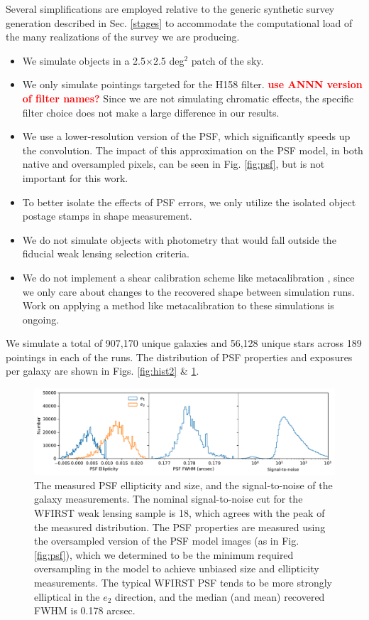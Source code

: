 \documentclass[aps,prd, amsmath,amssymb,superscriptaddress,showkeys,nofootinbib,reprint,preprintnumbers]{revtex4-1}
\newcommand{\verify}[1]{\textcolor{red}{\textbf{{#1}}}}
\begin{document}
Several simplifications are employed relative to the generic synthetic survey generation described in Sec. \ref{stages} to accommodate the computational load of the many realizations of the survey we are producing. 
\begin{itemize}
\item We simulate objects in a 2.5$\times$2.5 deg$^2$ patch of the sky.
\item We only simulate pointings targeted for the H158 filter. \verify{use ANNN version of filter names?}
Since we are not simulating chromatic effects, the specific filter choice does not make a large difference in our results.
\item We use a lower-resolution version of the PSF, which significantly speeds up the convolution.
The impact of this approximation on the PSF model, in both native and oversampled pixels, can be seen in Fig. \ref{fig:psf}, but is not important for this work.
\item To better isolate the effects of PSF errors, we only utilize the isolated object postage stamps in shape measurement.
\item We do not simulate objects with photometry that would fall outside the fiducial weak lensing selection criteria.
\item We do not implement a shear calibration scheme like metacalibration \cite{SheldonHuff2017}, since we only care about changes to the recovered shape between simulation runs. Work on applying a method like metacalibration to these simulations is ongoing.
\end{itemize}

We simulate a total of 907,170 unique galaxies and 56,128 unique stars across 189 pointings in each of the runs. The distribution of PSF properties and exposures per galaxy are shown in Figs. \ref{fig:hist2} \& \ref{fig:hist3}.

\begin{figure}
\begin{center}
\includegraphics[width=\textwidth]{figures/hist3.pdf}
\end{center}
\caption[]{
The measured PSF ellipticity and size, and the signal-to-noise of the galaxy measurements. The nominal signal-to-noise cut for the WFIRST weak lensing sample is 18, which agrees with the peak of the measured distribution. The PSF properties are measured using the oversampled version of the PSF model images (as in Fig. \ref{fig:psf}), which we determined to be the minimum required oversampling in the model to achieve unbiased size and ellipticity measurements. The typical WFIRST PSF tends to be more strongly elliptical in the $e_2$ direction, and the median (and mean) recovered FWHM is 0.178 arcsec.
\label{fig:hist3}}
\end{figure}
\end{document}
